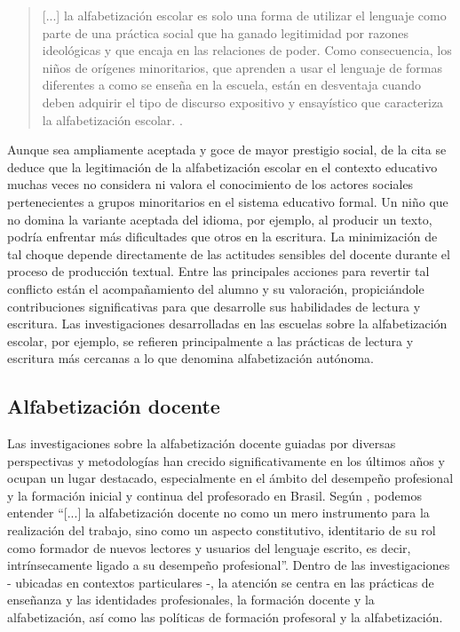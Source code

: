 \documentclass{textolivre}
\begin{document}
\begin{quote}
    [...] la alfabetización escolar es solo una forma de utilizar el lenguaje como parte de una práctica social que ha ganado legitimidad por razones ideológicas y que encaja en las relaciones de poder. Como consecuencia, los niños de orígenes minoritarios, que aprenden a usar el lenguaje de formas diferentes a como se enseña en la escuela, están en desventaja cuando deben adquirir el tipo de discurso expositivo y ensayístico que caracteriza la alfabetización escolar. \cite[p. 73]{zavala_quem_2010}.
\end{quote}

Aunque sea ampliamente aceptada y goce de mayor prestigio social, de la cita se deduce que la legitimación de la alfabetización escolar en el contexto educativo muchas veces no considera ni valora el conocimiento de los actores sociales pertenecientes a grupos minoritarios en el sistema educativo formal. Un niño que no domina la variante aceptada del idioma, por ejemplo, al producir un texto, podría enfrentar más dificultades que otros en la escritura. La minimización de tal choque depende directamente de las actitudes sensibles del docente durante el proceso de producción textual. Entre las principales acciones para revertir tal conflicto están el acompañamiento del alumno y su valoración, propiciándole contribuciones significativas para que desarrolle sus habilidades de lectura y escritura. Las investigaciones desarrolladas en las escuelas sobre la alfabetización escolar, por ejemplo, se refieren principalmente a las prácticas de lectura y escritura más cercanas a lo que \textcite{street_literacy_1984, street_letramentos_2014} denomina alfabetización autónoma.

\subsection{Alfabetización docente}\label{sec-docente}
Las investigaciones sobre la alfabetización docente guiadas por diversas perspectivas y metodologías han crecido significativamente en los últimos años y ocupan un lugar destacado, especialmente en el ámbito del desempeño profesional y la formación inicial y continua del profesorado en Brasil. Según \textcite[p. 21]{kleiman_projetos_2009}, podemos entender “[...] la alfabetización docente no como un mero instrumento para la realización del trabajo, sino como un aspecto constitutivo, identitario de su rol como formador de nuevos lectores y usuarios del lenguaje escrito, es decir, intrínsecamente ligado a su desempeño profesional”. Dentro de las investigaciones - ubicadas en contextos particulares -, la atención se centra en las prácticas de enseñanza y las identidades profesionales, la formación docente y la alfabetización, así como las políticas de formación profesoral y la alfabetización.
\end{document}

